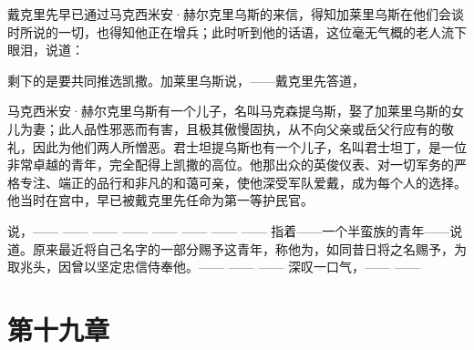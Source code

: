 戴克里先早已通过马克西米安·赫尔克里乌斯的来信，得知加莱里乌斯在他们会谈时所说的一切，也得知他正在增兵；此时听到他的话语，这位毫无气概的老人流下眼泪，说道：\par

剩下的是要共同推选凯撒。加莱里乌斯说，——戴克里先答道，\par

马克西米安·赫尔克里乌斯有一个儿子，名叫马克森提乌斯，娶了加莱里乌斯的女儿为妻；此人品性邪恶而有害，且极其傲慢固执，从不向父亲或岳父行应有的敬礼，因此为他们两人所憎恶。君士坦提乌斯也有一个儿子，名叫君士坦丁，是一位非常卓越的青年，完全配得上凯撒的高位。他那出众的英俊仪表、对一切军务的严格专注、端正的品行和非凡的和蔼可亲，使他深受军队爱戴，成为每个人的选择。他当时在宫中，早已被戴克里先任命为第一等护民官。\par

 说，—— —— —— —— —— —— —— —— 指着——一个半蛮族的青年——说道。原来最近将自己名字的一部分赐予这青年，称他为，如同昔日将之名赐予，为取兆头，因曾以坚定忠信侍奉他。—— —— —— 深叹一口气，—— —— \par


\section{第十九章}

